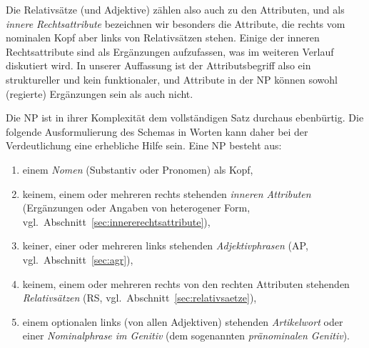 
Die Relativsätze (und Adjektive) zählen also auch zu den Attributen, und als \textit{innere Rechtsattribute} bezeichnen wir besonders die Attribute, die rechts vom nominalen Kopf aber links von Relativsätzen stehen.
Einige der inneren Rechtsattribute sind als Ergänzungen aufzufassen, was im weiteren Verlauf diskutiert wird.
In unserer Auffassung ist der Attributsbegriff also ein struktureller und kein funktionaler, und Attribute in der NP können sowohl (regierte) Ergänzungen sein als auch nicht. 



Die NP ist in ihrer Komplexität dem vollständigen Satz durchaus ebenbürtig.
Die folgende Ausformulierung des Schemas in Worten kann daher bei der Verdeutlichung eine erhebliche Hilfe sein.
Eine NP besteht aus:


\begin{enumerate}\Lf
  \item einem \textit{Nomen} (Substantiv oder Pronomen) als Kopf,
  \item keinem, einem oder mehreren rechts stehenden \textit{inneren Attributen} (Ergänzungen oder Angaben von heterogener Form, vgl.\ Abschnitt~\ref{sec:innererechtsattribute}),
  \item keiner, einer oder mehreren links stehenden \textit{Adjektivphrasen} (AP, vgl.\ Abschnitt~\ref{sec:agr}),
  \item keinem, einem oder mehreren rechts von den rechten Attributen stehenden \textit{Relativsätzen} (RS, vgl.\ Abschnitt~\ref{sec:relativsaetze}),
  \item einem optionalen links (von allen Adjektiven) stehenden \textit{Artikelwort} oder einer \textit{Nominalphrase im Genitiv} (dem sogenannten \textit{pränominalen Genitiv}).
\end{enumerate}

